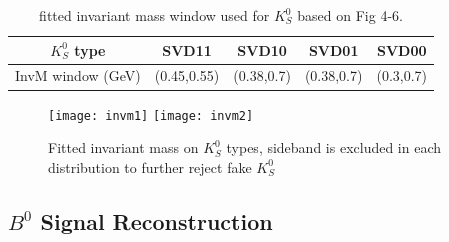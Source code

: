  
\begin{table}[h]
	\centering 
	\begin{tabular}{|c|c|c|c|c|} 
		\hline
		$K_S^0$ type & SVD11 & SVD10 & SVD01  & SVD00  \\
		\hline
		InvM window (GeV) & (0.45,0.55) & (0.38,0.7)  & (0.38,0.7)  & (0.3,0.7) \\
		\hline
	\end{tabular}
\caption{fitted invariant mass window used for $K_S^0$ based on Fig 4-6.}
\end{table}

\begin{figure}[htpb]
	\centering
	\texttt{[image: invm1]}
	\texttt{[image: invm2]}
	\caption{Fitted invariant mass on $K_S^0$ types, sideband is excluded in each distribution to further reject fake $K_S^0$}
	\label{fig:invm1}
\end{figure}

\subsection{$B^0$ Signal Reconstruction}



